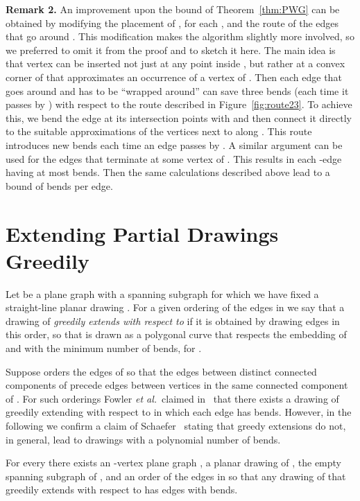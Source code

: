 \documentclass{llncs}
\begin{document}
{\bf Remark 2.} An improvement upon the  bound of Theorem~\ref{thm:PWG} can be obtained by modifying the placement of , for each , and the route of the edges that go around . This modification makes the algorithm slightly more involved, so we preferred to omit it from the proof and to sketch it here. The main idea is that vertex  can be inserted not just at any point inside , but rather at a convex corner of  that approximates an occurrence  of a vertex of . Then each edge that goes around  and has to be ``wrapped around''  can save three bends (each time it passes by ) with respect to the route described in Figure~\ref{fig:route23}. To achieve this, we bend the edge at its intersection points with  and then connect it directly to the suitable approximations of the vertices next to  along . This route introduces  new bends each time an edge passes by . A similar argument can be used for the edges that terminate at some vertex of . This results in each -edge having at most  bends. Then the same calculations described above lead to a bound of  bends per edge.

\section{Extending Partial Drawings Greedily} \label{se:greedy}

Let  be a plane graph with a spanning subgraph  for which we have fixed a straight-line planar drawing .
For a given ordering  of the edges in  we say that a drawing  of  {\em greedily extends  with respect to } if it is obtained by drawing edges  in this order, so that  is drawn as a polygonal curve that respects the embedding of  and with the minimum number of bends, for .

Suppose  orders the edges of  so that the edges between distinct connected components of  precede edges between vertices in the same connected component of . For such orderings Fowler {\em et al.}\ claimed in~\cite{fjks-crp-11} that there exists a drawing  of  greedily extending  with respect to  in which each edge has  bends. However, in the following we confirm a claim of Schaefer~\cite{S13a} stating that greedy extensions do not, in general, lead to drawings with a polynomial number of bends.

\begin{theorem}\label{th:greedy}
For every  there exists an -vertex plane graph , a planar drawing  of , the empty spanning subgraph of , and an order  of the edges in  so that any drawing of  that greedily extends  with respect to  has edges with  bends.
\end{theorem}
\end{document}
